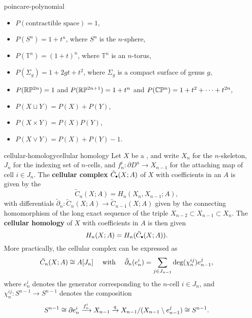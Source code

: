 \begin{example}{poincare-polynomial}
    \begin{itemize}
        \item $P(\text{contractible space}) = 1$,
        \item $P(S^n) = 1 + t^n$, where $S^n$ is the $n$-sphere,
        \item $P(\mathbb{T}^n) = (1 + t)^n$, where $\mathbb{T}^n$ is an $n$-torus,
        \item $P(\Sigma_g) = 1 + 2gt + t^2$, where $\Sigma_g$ is a compact surface of genus $g$,
        \item $P(\mathbb{R} \mathbb{P}^{2n}) = 1$ and $P(\mathbb{R} \mathbb{P}^{2n + 1}) = 1 + t^n$ and $P(\mathbb{C} \mathbb{P}^n) = 1 + t^2 + \cdots + t^{2n}$,
        \item $P(X \sqcup Y) = P(X) + P(Y)$,
        \item $P(X \times Y) = P(X) P(Y)$,
        \item $P(X \vee Y) = P(X) + P(Y) - 1$.
    \end{itemize}
\end{example}

\begin{topic}{cellular-homology}{cellular homology}
    Let $X$ be a , and write $X_n$ for the $n$-skeleton, $J_n$ for the indexing set of $n$-cells, and $f_n^i : \partial D^n \to X_{n - 1}$ for the attaching map of cell $i \in J_n$. The \textbf{cellular complex} $\tilde{C}_\bdot(X; A)$ of $X$ with coefficients in an  $A$ is given by the 
    \[ \tilde{C}_n(X; A) = H_n(X_n, X_{n - 1}; A) , \]
    with differentials $\tilde{\partial}_n : \tilde{C}_n(X; A) \to \tilde{C}_{n - 1}(X; A)$ given by the connecting homomorphism of the long exact sequence of the triple $X_{n - 2} \subset X_{n - 1} \subset X_n$. The \textbf{cellular homology} of $X$ with coefficients in $A$ is then given
    \[ H_n(X; A) = H_n(\tilde{C}_\bdot(X; A)) . \]
    More practically, the cellular complex can be expressed as
    \[ \tilde{C}_n(X; A) \cong A[J_n] \quad \textup{ with } \quad \tilde{\partial}_n(e_n^i) = \sum_{j \in J_{n - 1}} \deg(\chi_n^{ij}) e_{n - 1}^j , \]
    where $e_n^i$ denotes the generator corresponding to the $n$-cell $i \in J_n$, and $\chi_n^{ij} : S^{n - 1} \to S^{n - 1}$ denotes the composition
    \[ S^{n - 1} \cong \partial e_n^i \xrightarrow{f_n^i} X_{n - 1} \xrightarrow{q} X_{n - 1} / (X_{n - 1} \setminus e_{n - 1}^j) \cong S^{n - 1} . \]
\end{topic}

